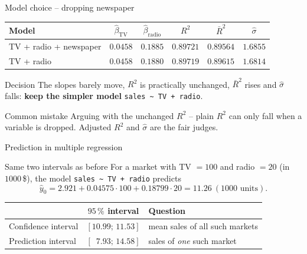 \documentclass[aspectratio=169,11pt]{beamer}
\begin{document}
\begin{frame}{Model choice -- dropping newspaper}
  \begin{center}
    \renewcommand{\arraystretch}{1.3}
    \begin{tabular}{lccccc}
      \toprule
      Model & $\hat\beta_{\text{TV}}$ & $\hat\beta_{\text{radio}}$ & $R^2$ & $\bar R^2$ & $\hat\sigma$\\
      \midrule
      TV + radio + newspaper & $0.0458$ & $0.1885$ & $0.89721$ & $0.89564$ & $1.6855$\\
      TV + radio & $0.0458$ & $0.1880$ & $0.89719$ & $0.89615$ & $1.6814$\\
      \bottomrule
    \end{tabular}
  \end{center}
  \begin{exampleblock}{Decision}
    The slopes barely move, $R^2$ is practically unchanged, $\bar R^2$ rises
    and $\hat\sigma$ falls: \textbf{keep the simpler model}
    \texttt{sales \textasciitilde\ TV + radio}.
  \end{exampleblock}
  \begin{alertblock}{Common mistake}
    Arguing with the unchanged $R^2$ -- plain $R^2$ can only fall when a
    variable is dropped. Adjusted $R^2$ and $\hat\sigma$ are the fair judges.
  \end{alertblock}
\end{frame}

\begin{frame}{Prediction in multiple regression}
  \begin{block}{Same two intervals as before}
    For a market with TV $=100$ and radio $=20$ (in $1000$\,\$), the model
    \texttt{sales \textasciitilde\ TV + radio} predicts
    \[
      \hat y_0=2.921+0.04575\cdot100+0.18799\cdot20=11.26\ (1000\text{ units}).
    \]
  \end{block}
  \begin{center}
    \renewcommand{\arraystretch}{1.3}
    \begin{tabular}{lcl}
      \toprule
      & $95\,\%$ interval & Question\\
      \midrule
      Confidence interval & $[10.99;\,11.53]$ & mean sales of all such markets\\
      Prediction interval & $[\phantom{0}7.93;\,14.58]$ & sales of \emph{one} such market\\
      \bottomrule
    \end{tabular}
  \end{center}
\end{frame}
\end{document}

